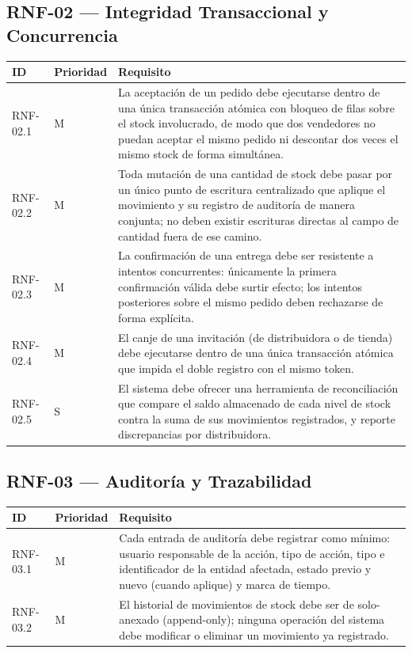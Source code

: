 \documentclass[12pt,a4paper]{report}
\begin{document}
\subsection{RNF-02 --- Integridad Transaccional y Concurrencia}

\begin{longtable}{|p{2.5cm}|p{2cm}|p{9.5cm}|}
\hline
\textbf{ID} & \textbf{Prioridad} & \textbf{Requisito} \\ \hline
RNF-02.1 & M & La aceptación de un pedido debe ejecutarse dentro de una única transacción atómica con bloqueo de filas sobre el stock involucrado, de modo que dos vendedores no puedan aceptar el mismo pedido ni descontar dos veces el mismo stock de forma simultánea. \\ \hline
RNF-02.2 & M & Toda mutación de una cantidad de stock debe pasar por un único punto de escritura centralizado que aplique el movimiento y su registro de auditoría de manera conjunta; no deben existir escrituras directas al campo de cantidad fuera de ese camino. \\ \hline
RNF-02.3 & M & La confirmación de una entrega debe ser resistente a intentos concurrentes: únicamente la primera confirmación válida debe surtir efecto; los intentos posteriores sobre el mismo pedido deben rechazarse de forma explícita. \\ \hline
RNF-02.4 & M & El canje de una invitación (de distribuidora o de tienda) debe ejecutarse dentro de una única transacción atómica que impida el doble registro con el mismo token. \\ \hline
RNF-02.5 & S & El sistema debe ofrecer una herramienta de reconciliación que compare el saldo almacenado de cada nivel de stock contra la suma de sus movimientos registrados, y reporte discrepancias por distribuidora. \\ \hline
\end{longtable}

\subsection{RNF-03 --- Auditoría y Trazabilidad}

\begin{longtable}{|p{2.5cm}|p{2cm}|p{9.5cm}|}
\hline
\textbf{ID} & \textbf{Prioridad} & \textbf{Requisito} \\ \hline
RNF-03.1 & M & Cada entrada de auditoría debe registrar como mínimo: usuario responsable de la acción, tipo de acción, tipo e identificador de la entidad afectada, estado previo y nuevo (cuando aplique) y marca de tiempo. \\ \hline
RNF-03.2 & M & El historial de movimientos de stock debe ser de solo-anexado (append-only); ninguna operación del sistema debe modificar o eliminar un movimiento ya registrado. \\ \hline
\end{longtable}
\end{document}
